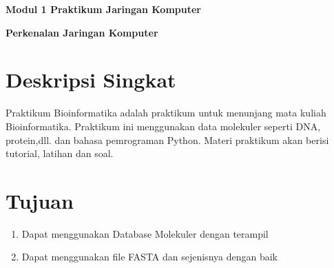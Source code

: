 \documentclass{article}
\begin{document}
    \begin{center}  
        \textbf{Modul 1 Praktikum Jaringan Komputer}

        \textbf{Perkenalan Jaringan Komputer}
    \end{center}

    \section*{Deskripsi Singkat}
   Praktikum Bioinformatika adalah praktikum untuk menunjang mata kuliah Bioinformatika. Praktikum ini menggunakan data molekuler seperti DNA, protein,dll. dan bahasa pemrograman Python. Materi praktikum akan berisi tutorial, latihan dan soal.
   

    \section*{Tujuan}
    \begin{enumerate}
        \item Dapat menggunakan Database Molekuler dengan terampil
        \item Dapat menggunakan file FASTA dan sejenisnya dengan baik
    \end{enumerate}
\end{document}
